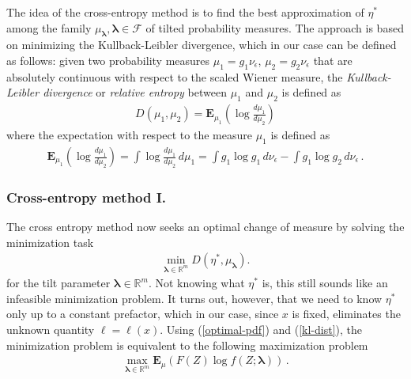 \documentclass[final]{siamltex}
\newcommand{\cF}{{\mathcal F}}
\newcommand{\bR}{{\mathbb R}}
\newcommand{\R}{{\mathbb R}}
\newcommand{\bE}{{\mathbf E}}
\newcommand{\eps}{\epsilon}
\newcommand{\blambda}{\bm{\lambda}}
\newcommand{\wrt}{with respect to }
\begin{document}
The idea of the cross-entropy method is to find the best approximation of $\eta^*$ among the family
$\mu_{\blambda}, \blambda \in \cF$ of tilted probability measures. The approach is based on minimizing the 
Kullback-Leibler divergence, which in our case can be defined as follows:
given two probability measures $\mu_1 = g_1\nu_{\eps}$, $\mu_2 =
g_2\nu_{\eps}$ that are absolutely continuous \wrt the scaled Wiener measure, the \emph{Kullback-Leibler divergence} or \emph{relative entropy} between $\mu_{1}$ and $\mu_{2}$ is defined as
\begin{align}
  D(\mu_1, \mu_2) = \bE_{\mu_1}\!\left(\log \frac{d\mu_1}{d\mu_2}\right) 
  \label{kl-dist}
\end{align}
where the expectation \wrt the measure $\mu_{1}$ is defined as
\begin{align}
  \bE_{\mu_1}\!\left(\log \frac{d\mu_1}{d\mu_2}\right) = \int \log \frac{d\mu_1}{d\mu_2}\,d\mu_{1} = \int
  g_1\log g_1\, d\nu_{\eps} - \int g_1\log g_2\,d\nu_{\eps}\,.
  \label{kl-dist2}
\end{align}


\subsubsection*{Cross-entropy method I.}
%
The cross entropy method now seeks an optimal change of measure by solving the minimization task
\begin{align}
  \min_{\blambda\in\R^{m}} D(\eta^*, \mu_{\blambda}).
  \label{kl-dist-d}
\end{align}
for the tilt parameter $\blambda\in\R^{m}$. Not knowing what $\eta^{*}$ is, this still sounds like an infeasible minimization problem. It turns out, however, that we need to know $\eta^{*}$ only up to a constant prefactor, which in our case, since $x$ is fixed, eliminates the unknown quantity $\ell=\ell(x)$. Using (\ref{optimal-pdf}) and (\ref{kl-dist}), the minimization problem is equivalent to the following maximization problem
\begin{align}\label{ce-1}
  \max_{\blambda \in \bR^m} \bE_{\mu} ( F(Z) \log
  f(Z;\blambda))\,.
\end{align}
\end{document}
